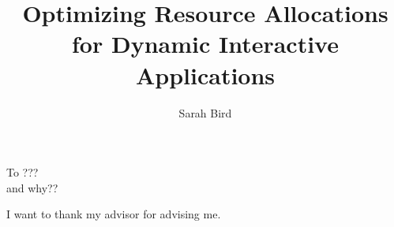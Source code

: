 \documentclass{ucbthesis}
\begin{document}

\title{Optimizing Resource Allocations for Dynamic Interactive Applications}
\author{Sarah Bird}


\maketitle
\approvalpage
\copyrightpage



\begin{frontmatter}

\begin{dedication}
\null\vfil
\begin{center}
To ???\\\vspace{12pt}
and why??
\end{center}
\vfil\null
\end{dedication}

\tableofcontents
\clearpage
\listoffigures
\clearpage
\listoftables

\begin{acknowledgements}
I want to thank my advisor for advising me.
\end{acknowledgements}

\end{frontmatter}

\pagestyle{headings}











\printbibliography
\end{document}
